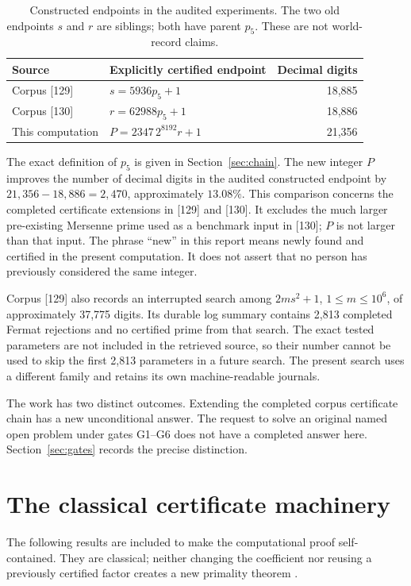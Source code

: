 \documentclass[11pt,a4paper]{article}
\theoremstyle{definition}\newtheorem{definition}[theorem]{Definition}
\theoremstyle{remark}\newtheorem{remark}[theorem]{Remark}
\begin{document}
\begin{table}[ht]
\centering\small
\begin{tabularx}{\linewidth}{@{}lXr@{}}
\toprule
Source & Explicitly certified endpoint & Decimal digits\\
\midrule
Corpus [129] & $s=5936p_5+1$ & 18,885\\
Corpus [130] & $r=62988p_5+1$ & 18,886\\
This computation & $P=2347\,2^{8192}r+1$ & 21,356\\

\bottomrule
\end{tabularx}
\caption{Constructed endpoints in the audited experiments. The two old
endpoints $s$ and $r$ are siblings; both have parent $p_5$.
These are not world-record claims.}
\label{tab:records}
\end{table}

The exact definition of $p_5$ is given in Section~\ref{sec:chain}.
The new integer $P$ improves the number of decimal digits in the audited
constructed endpoint by $21,356-18,886=2,470$, approximately $13.08\%$.
This comparison concerns the completed certificate extensions in [129]
and [130]. It excludes the much larger pre-existing Mersenne prime used
as a benchmark input in [130]; $P$ is not larger than that input.
The phrase ``new'' in this report means newly found and certified in the
present computation. It does not assert that no person has previously
considered the same integer.

Corpus [129] also records an interrupted search among
$2ms^2+1$, $1\leq m\leq10^6$, of approximately 37,775 digits. Its durable
log summary contains 2,813 completed Fermat rejections and no certified
prime from that search. The exact tested parameters are not included in
the retrieved source, so their number cannot be used to skip the first
2,813 parameters in a future search. The present search uses a different
family and retains its own machine-readable journals.

The work has two distinct outcomes. Extending the completed corpus
certificate chain has a new unconditional answer. The request to solve an original named
open problem under gates G1--G6 does not have a completed answer here.
Section~\ref{sec:gates} records the precise distinction.

\section{The classical certificate machinery}
\label{sec:certificates}
The following results are included to make the computational proof
self-contained. They are classical; neither changing the coefficient nor
reusing a previously certified factor creates a new primality theorem
\cite{pocklington1914,bls1975,caldwell}.
\end{document}
